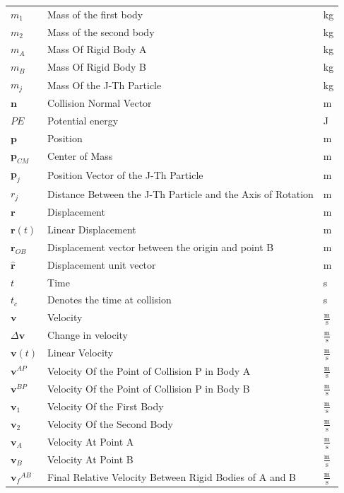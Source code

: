 \documentclass[12pt]{article}
\begin{document}
\begin{longtabu}{l X[l] l}
${m_{1}}$ & Mass of the first body & kg
\\
${m_{2}}$ & Mass of the second body & kg
\\
${m_{A}}$ & Mass Of Rigid Body A & kg
\\
${m_{B}}$ & Mass Of Rigid Body B & kg
\\
${m_{j}}$ & Mass Of the J-Th Particle & kg
\\
$\mathbf{n}$ & Collision Normal Vector & m
\\
$PE$ & Potential energy & J
\\
$\mathbf{p}$ & Position & m
\\
${\mathbf{p}_{CM}}$ & Center of Mass & m
\\
${\mathbf{p}_{j}}$ & Position Vector of the J-Th Particle & m
\\
${r_{j}}$ & Distance Between the J-Th Particle and the Axis of Rotation & m
\\
$\mathbf{r}$ & Displacement & m
\\
$\mathbf{r}(t)$ & Linear Displacement & m
\\
${\mathbf{r}_{OB}}$ & Displacement vector between the origin and point B & m
\\
$\mathbf{\hat{r}}$ & Displacement unit vector & m
\\
$t$ & Time & s
\\
${t_{c}}$ & Denotes the time at collision & s
\\
$\mathbf{v}$ & Velocity & $\frac{\text{m}}{\text{s}}$
\\
$Δ\mathbf{v}$ & Change in velocity & $\frac{\text{m}}{\text{s}}$
\\
$\mathbf{v}(t)$ & Linear Velocity & $\frac{\text{m}}{\text{s}}$
\\
${\mathbf{v}^{AP}}$ & Velocity Of the Point of Collision P in Body A & $\frac{\text{m}}{\text{s}}$
\\
${\mathbf{v}^{BP}}$ & Velocity Of the Point of Collision P in Body B & $\frac{\text{m}}{\text{s}}$
\\
${\mathbf{v}_{1}}$ & Velocity Of the First Body & $\frac{\text{m}}{\text{s}}$
\\
${\mathbf{v}_{2}}$ & Velocity Of the Second Body & $\frac{\text{m}}{\text{s}}$
\\
${\mathbf{v}_{A}}$ & Velocity At Point A & $\frac{\text{m}}{\text{s}}$
\\
${\mathbf{v}_{B}}$ & Velocity At Point B & $\frac{\text{m}}{\text{s}}$
\\
${{\mathbf{v}_{f}}^{AB}}$ & Final Relative Velocity Between Rigid Bodies of A and B & $\frac{\text{m}}{\text{s}}$

\end{longtabu}
\end{document}
